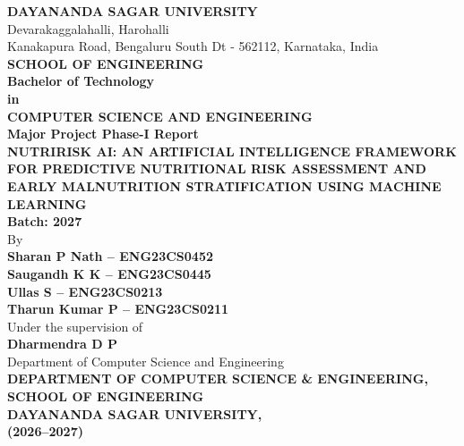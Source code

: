 \documentclass[12pt,a4paper]{report}
\begin{document}

\begin{titlepage}
\thispagestyle{empty}
\begin{center}
    {\LARGE\bfseries DAYANANDA SAGAR UNIVERSITY}\\[6pt]
    {\small Devarakaggalahalli, Harohalli}\\
    {\small Kanakapura Road, Bengaluru South Dt - 562112, Karnataka, India}\\[18pt]
    {\large\bfseries\color{dsublue} SCHOOL OF ENGINEERING}\\[20pt]
    {\large\bfseries Bachelor of Technology}\\
    {\large\bfseries in}\\
    {\large\bfseries COMPUTER SCIENCE AND ENGINEERING}\\[20pt]
    {\Large\bfseries Major Project Phase-I Report}\\[14pt]
    {\LARGE\bfseries NUTRIRISK AI: AN ARTIFICIAL INTELLIGENCE FRAMEWORK FOR PREDICTIVE NUTRITIONAL RISK ASSESSMENT AND EARLY MALNUTRITION STRATIFICATION USING MACHINE LEARNING}\\[12pt]
    {\normalsize\bfseries Batch: 2027}\\[16pt]
    {\normalsize By}\\[6pt]
    {\normalsize\bfseries
    Sharan P Nath -- ENG23CS0452\\
    Saugandh K K -- ENG23CS0445\\
    Ullas S -- ENG23CS0213\\
    Tharun Kumar P -- ENG23CS0211
    }\\[22pt]
    {\normalsize Under the supervision of}\\
    {\normalsize\bfseries Dharmendra D P}\\
    {\small Department of Computer Science and Engineering}\\[26pt]
    {\normalsize\bfseries
    DEPARTMENT OF COMPUTER SCIENCE \& ENGINEERING,\\
    SCHOOL OF ENGINEERING\\
    DAYANANDA SAGAR UNIVERSITY,\\
    (2026--2027)
    }
\end{center}
\end{titlepage}
\setcounter{page}{2}
\end{document}
